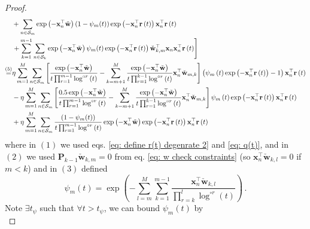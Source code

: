 \documentclass[twoside,11pt,english]{article}
\begin{document}
{\begin{proof}
\begin{align}
&+\sum_{n\in\mathcal{S}_{m}}\exp\left(-\mathbf{x}_{n}^{\top}\tilde{\mathbf{w}}\right)\left(1-\psi_m(t)\right)\exp\left(-\mathbf{x}_{n}^{\top}\mathbf{r}\left(t\right)\right)\mathbf{x}_{n}^{\top}\mathbf{r}\left(t\right)\nonumber\\
&\left.+\sum_{k=1}^{m-1}\sum_{n\in \mathcal{S}_k}\exp\left(-\mathbf{x}_{n}^{\top}\tilde{\mathbf{w}}\right)\psi_m(t)\exp\left(-\mathbf{x}_{n}^{\top}\mathbf{r}\left(t\right)\right)\check{\mathbf{w}}_{k,m}^{\top}\mathbf{x}_n\mathbf{x}_{n}^{\top}\mathbf{r}\left(t\right)\right]\nonumber \\
\overset{\left(5\right)}{=} & \eta\sum_{m=1}^{M}\sum_{n\in\mathcal{S}_{m}}\left[\frac{\exp\left(-\mathbf{x}_{n}^{\top}\tilde{\mathbf{w}}\right)}{t\prod_{r=1}^{m-1}\log^{\circ r}\left(t\right)}-\sum_{k=m+1}^{M}\frac{\exp\left(-\mathbf{x}_{n}^{\top}\tilde{\mathbf{w}}\right)}{t\prod_{r=1}^{k-1}\log^{\circ r}\left(t\right)}\mathbf{x}_{n}^{\top}\check{\mathbf{w}}_{m,k}\right]\left(\psi_{m}\left(t\right)\exp\left(-\mathbf{x}_{n}^{\top}\mathbf{r}\left(t\right)\right)-1\right)\mathbf{x}_{n}^{\top}\mathbf{r}\left(t\right)\nonumber\\
&-\eta\sum_{m=1}^{M}\sum_{n\in\mathcal{S}_{m}}\left[\frac{0.5 \exp\left(-\mathbf{x}_{n}^{\top}\tilde{\mathbf{w}}\right)}{t\prod_{r=1}^{m-1}\log^{\circ r}\left(t\right)}-\sum_{k=m+1}^{M}\frac{\exp\left(-\mathbf{x}_{n}^{\top}\tilde{\mathbf{w}}\right)}{t\prod_{r=1}^{k-1}\log^{\circ r}\left(t\right)}\mathbf{x}_{n}^{\top}\check{\mathbf{w}}_{m,k}\right]\psi_{m}\left(t\right)\exp\left(-\mathbf{x}_{n}^{\top}\mathbf{r}\left(t\right)\right)\mathbf{x}_{n}^{\top}\mathbf{r}\left(t\right)\nonumber\\
&+\eta\sum_{m=1}^{M}\sum_{n\in\mathcal{S}_{m}}\frac{\left(1-\psi_m(t)\right)}{t\prod_{r=1}^{m-1}\log^{\circ r}\left(t\right)}\exp\left(-\mathbf{x}_{n}^{\top}\tilde{\mathbf{w}}\right)\exp\left(-\mathbf{x}_{n}^{\top}\mathbf{r}\left(t\right)\right)\mathbf{x}_{n}^{\top}\mathbf{r}\left(t\right)\nonumber\\
\label{eq: main term, degenerate}
\end{align}
where in $\left(1\right)$ we used eqs. \ref{eq: define r(t) degenrate 2}
and \ref{eq: q(t)}, and in $\left(2\right)$ we used $\mathbf{P}_{k-1}\check{\mathbf{w}}_{k,m}=0$
from eq. \ref{eq: w check constraints} (so $\mathbf{x}_{n}^{\top}\check{\mathbf{w}}_{k,l}=0$
if $m<k$) and in $\left(3\right)$ defined 
\[
\psi_{m}\left(t\right)=\exp\left(-\sum_{l=m}^{M}\sum_{k=1}^{m-1}\frac{\mathbf{x}_{n}^{\top}\check{\mathbf{w}}_{k,l}}{\prod_{r=k}^{l}\log^{\circ r}\left(t\right)}\right)\,.
\]
Note $\exists t_{\psi}$ such that $\forall t>t_{\psi}$, we can bound
$\psi_{m}\left(t\right)$ by
\begin{equation}

\end{equation}
\end{proof}}
\end{document}
